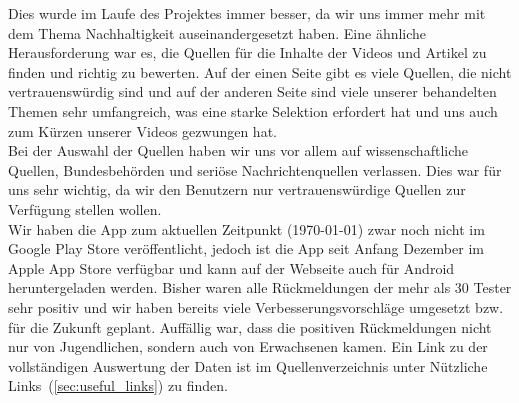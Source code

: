 \documentclass[../main.tex]{subfiles}
\begin{document}
    Dies wurde im Laufe des Projektes immer besser, da wir uns immer mehr mit dem Thema Nachhaltigkeit auseinandergesetzt haben.
    Eine ähnliche Herausforderung war es, die Quellen für die Inhalte der Videos und Artikel zu finden und richtig zu bewerten.
    Auf der einen Seite gibt es viele Quellen, die nicht vertrauenswürdig sind und auf der anderen Seite sind viele unserer behandelten Themen sehr umfangreich, was eine starke Selektion erfordert hat und uns auch zum Kürzen unserer Videos gezwungen hat.
    \\
    Bei der Auswahl der Quellen haben wir uns vor allem auf wissenschaftliche Quellen, Bundesbehörden und seriöse Nachrichtenquellen verlassen.
    Dies war für uns sehr wichtig, da wir den Benutzern nur vertrauenswürdige Quellen zur Verfügung stellen wollen.
    \\
    Wir haben die App zum aktuellen Zeitpunkt (\today) zwar noch nicht im Google Play Store veröffentlicht, jedoch ist die App seit Anfang Dezember im Apple App Store verfügbar und kann auf der Webseite auch für Android heruntergeladen werden.
    Bisher waren alle Rückmeldungen der mehr als 30 Tester sehr positiv und wir haben bereits viele Verbesserungsvorschläge umgesetzt bzw. für die Zukunft geplant.
    Auffällig war, dass die positiven Rückmeldungen nicht nur von Jugendlichen, sondern auch von Erwachsenen kamen.
    Ein Link zu der vollständigen Auswertung der Daten ist im Quellenverzeichnis unter \dq Nützliche Links\dq\ (\ref{sec:useful_links}) zu finden.
\end{document}
